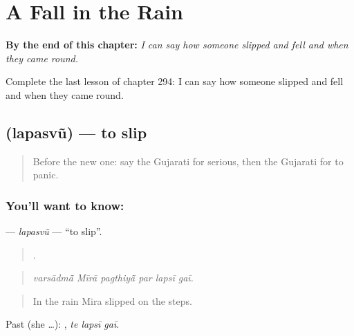 
\chapter{A Fall in the Rain}
\label{ch:gu-a-fall-in-the-rain}

\begin{chapteropening}
\textbf{By the end of this chapter:} \emph{I can say how someone slipped and fell and when they came round.}

Complete the last lesson of chapter 294: I can say how someone slipped and fell and when they came round.
\end{chapteropening}

\section[\texorpdfstring{\gu{લપસવું} (lapasvũ)}{લપસવું (lapasvũ)}]{ (lapasvũ) — to slip}

\label{lesson:GU-C294-lapasvu}



\begin{quote}
Before the new one: say the Gujarati for serious, then the Gujarati for to panic.
\end{quote}

\subsection*{You'll want to know: }
\textbf{} — \emph{lapasvũ} — \textquotedblleft{}to slip\textquotedblright{}.

\begin{quote}
     .
\end{quote}

\begin{quote}
\emph{varsādmā̃ Mīrā pagthiyā̃ par lapsī gaī.}
\end{quote}

\begin{quote}
In the rain Mira slipped on the steps.
\end{quote}

Past (she …):   , \emph{te lapsī gaī}.

